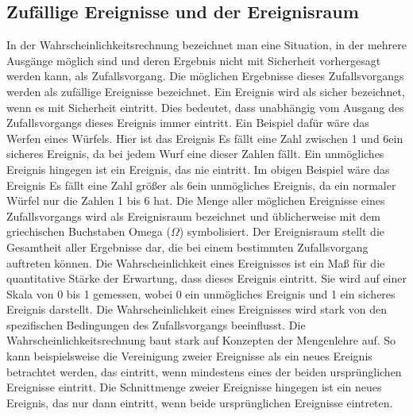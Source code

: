 \subsection{Zufällige Ereignisse und der Ereignisraum}
In der Wahrscheinlichkeitsrechnung bezeichnet man eine Situation, in der mehrere Ausgänge möglich sind und deren Ergebnis nicht mit Sicherheit vorhergesagt werden kann, als Zufallsvorgang.
Die möglichen Ergebnisse dieses Zufallsvorgangs werden als zufällige Ereignisse bezeichnet.
\newline \newline
Ein Ereignis wird als sicher bezeichnet, wenn es mit Sicherheit eintritt.
Dies bedeutet, dass unabhängig vom Ausgang des Zufallsvorgangs dieses Ereignis immer eintritt.
Ein Beispiel dafür wäre das Werfen eines Würfels. Hier ist das Ereignis \glqq Es fällt eine Zahl zwischen 1 und 6\grqq ein sicheres Ereignis, da bei jedem Wurf eine dieser Zahlen fällt.
\newline \newline
Ein unmögliches Ereignis hingegen ist ein Ereignis, das nie eintritt.
Im obigen Beispiel wäre das Ereignis \glqq Es fällt eine Zahl größer als 6\grqq ein unmögliches Ereignis, da ein normaler Würfel nur die Zahlen 1 bis 6 hat.
\newline \newline
Die Menge aller möglichen Ereignisse eines Zufallsvorgangs wird als Ereignisraum bezeichnet und üblicherweise mit dem griechischen Buchstaben Omega ($\Omega$) symbolisiert.
Der Ereignisraum stellt die Gesamtheit aller Ergebnisse dar, die bei einem bestimmten Zufallsvorgang auftreten können.
\newline \newline
Die Wahrscheinlichkeit eines Ereignisses ist ein Maß für die quantitative Stärke der Erwartung, dass dieses Ereignis eintritt.
Sie wird auf einer Skala von 0 bis 1 gemessen, wobei 0 ein unmögliches Ereignis und 1 ein sicheres Ereignis darstellt.
Die Wahrscheinlichkeit eines Ereignisses wird stark von den spezifischen Bedingungen des Zufallsvorgangs beeinflusst.
\newline \newline
Die Wahrscheinlichkeitsrechnung baut stark auf Konzepten der Mengenlehre auf.
So kann beispielsweise die Vereinigung zweier Ereignisse als ein neues Ereignis betrachtet werden, das eintritt, wenn mindestens eines der beiden ursprünglichen Ereignisse eintritt.
Die Schnittmenge zweier Ereignisse hingegen ist ein neues Ereignis, das nur dann eintritt, wenn beide ursprünglichen Ereignisse eintreten.

